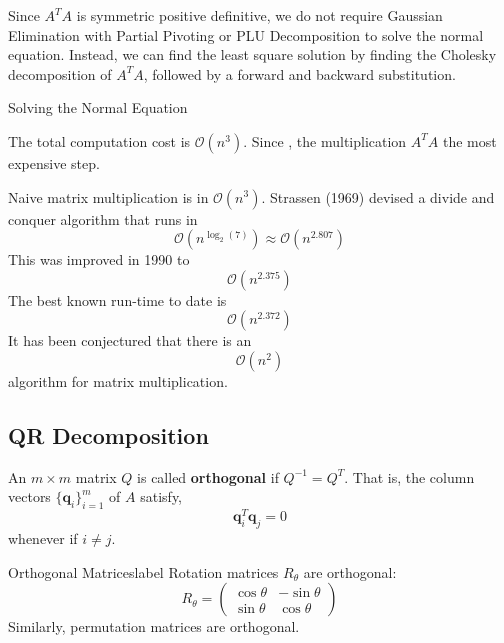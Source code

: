Since $A^T A$ is symmetric positive definitive, we do not require Gaussian Elimination with Partial Pivoting or PLU Decomposition to solve the normal equation. Instead, we can find the least square solution by finding the Cholesky decomposition of $A^T A$, followed by a forward and backward substitution. 

\begin{algorithm}
	  \caption{Solving the Normal Equation}
\end{algorithm}

\begin{cor}
	The total computation cost is $\mathcal{O}(n^3)$. Since , the multiplication $A^T A$ the most expensive step.
\end{cor}

\begin{marginfigure}
	Naive matrix multiplication is in $\mathcal{O}(n^3)$. Strassen (1969) devised a divide and conquer algorithm that runs in
	\[\mathcal{O}(n^{\log _2(7)}) \approx \mathcal{O}(n^{2.807})\]
	This was improved in 1990 to
	\[\mathcal{O}(n^{2.375})\]
	The best known run-time to date is
	\[\mathcal{O}(n^{2.372})\]
	It has been conjectured that there is an
	\[\mathcal{O}(n^2)\]
	algorithm for matrix multiplication.
\end{marginfigure}

\subsection{QR Decomposition}

\begin{defn}[Orthogonal]
	An $m \times m$ matrix $Q$ is called \textbf{orthogonal} if $Q^{-1} = Q^T$. That is, the column vectors $\{\mathbf{q}_i\}_{i=1}^m$ of $A$ satisfy,
	\[\boldsymbol{q}_i^T \boldsymbol{q}_j=0\]
	whenever if $i \neq j$.
\end{defn}

\begin{ex}{Orthogonal Matrices}{label}
	Rotation matrices $R_{\theta}$ are orthogonal:
	\[R_\theta=\left(\begin{array}{cc}\cos \theta & -\sin \theta \\ \sin \theta & \cos \theta\end{array}\right)\]
	Similarly, permutation matrices are orthogonal.
\end{ex}

